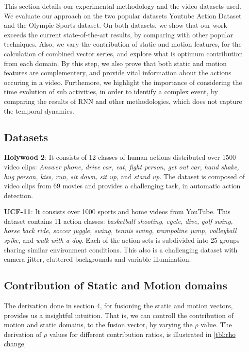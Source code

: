 This section details our experimental methodology and the  video  datasets used. We evaluate our approach on the two popular datasets
Youtube Action Dataset and the Olympic Sports dataset. On both datasets, we show that our work exceeds the current state-of-the-art
results, by comparing with other popular techniques. Also, we vary the contribution of static and motion features, for the calculation
of combined vector series, and explore what is optimum contribution from each domain. By this step, we also prove that both static and motion features
are complementery, and provide vital information about the actions occuring in a video. Furthemore, we highlight the importance of considering the time evolution
of sub activities, in order to identify a complex event, by comparing the results of RNN and other methodologies, which does not capture
the temporal dynamics. 

\subsection{Datasets}
\noindent
\textbf{Holywood 2}: It consists of 12 classes of human actions distributed over 1500 video clips:
\textit{Answer phone, drive car, eat, fight person, get out car, hand shake, 
hug person, kiss, run, sit down, sit up, }and \textit{stand up}.
The dataset is composed of video clips from 69 movies and provides a challenging task, in automatic action detection.

\noindent
\textbf{UCF-11}: It consists over 1000
sports and home videos from YouTube. This dataset contains 11 action classes: 
\textit{basketball shooting, cycle, dive, golf swing, horse
back ride, soccer juggle, swing, tennis swing, trampoline
jump, volleyball spike}, and \textit{walk with a dog}. Each of the action 
sets is subdivided into 25 groups sharing similar environment conditions. 
This also is a challenging dataset with
camera jitter, cluttered backgrounds and variable illumination. 


\subsection{Contribution of Static and Motion domains}

The derivation done in section 4, for fusioning the static and motion vectors,
provides us a insightful intuition. That is, we can controll the contribution
of motion and static domains, to the fusion vector, by varying the $\rho$ value. 
The derivation of $\rho$ values for different contribution ratios, is illustrated in 
\ref{tbl:rho change}

